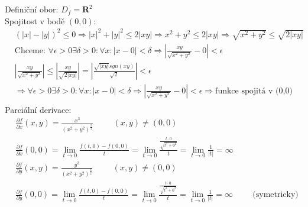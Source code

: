 \documentclass[a4paper]{article}
\begin{document}
\text{}\vspace{-0.1cm}
{\fontsize{12}{15}\selectfont \hspace{-0.5cm}}

\section{}
Definiční obor: $D_f = \mathbf{R}^2$ \\
Spojitost v bodě $(0,0)$:
\begin{align*}
	& (|x|-|y|)^2 \le 0 \Rightarrow |x|^2 + |y|^2 \le 2|xy| \Rightarrow x^2 + y^2 \le 2|xy| \Rightarrow \sqrt{x^2 + y^2} \le \sqrt{2|xy|} \\
	& \text{Chceme: } \forall \epsilon >0 \exists \delta >0: \forall x: |x-0| < \delta \Rightarrow |\frac{xy}{\sqrt{x^2 +y^2}}-0| < \epsilon \\
	& |\frac{xy}{\sqrt{x^2 +y^2}}| \le |\frac{xy}{\sqrt{2|xy|}}| = |\frac{\sqrt{|xy|} sgn(xy)}{\sqrt{2}}| < \epsilon \\
	& \Rightarrow \forall \epsilon >0 \exists \delta >0: \forall x: |x-0| < \delta \Rightarrow |\frac{xy}{\sqrt{x^2 +y^2}}-0| < \epsilon \Rightarrow \text{funkce spojitá v (0,0)} \\
\end{align*}
Parciální derivace:
\begin{align*}
	& \frac{\partial f}{\partial x} (x,y) = \frac{x^3}{(x^2 + y^2)^{\frac{3}{2}}} \hspace{1cm} (x,y) \ne (0,0) \\
	& \frac{\partial f}{\partial x} (0,0) = \lim_{t \to 0} \frac{f(t,0) - f(0,0)}{t} = \lim_{t \to 0} \frac{\frac{t\cdot 0}{\sqrt{t^2+0^2}}}{t} = \lim_{t \to 0} \frac{1}{|t|} = \infty \\
	& \frac{\partial f}{\partial y} (x,y) = \frac{y^3}{(x^2 + y^2)^{\frac{3}{2}}} \hspace{1cm} (x,y) \ne (0,0) \\
	& \frac{\partial f}{\partial y} (0,0) = \lim_{t \to 0} \frac{f(t,0) - f(0,0)}{t} = \lim_{t \to 0} \frac{\frac{t\cdot 0}{\sqrt{t^2+0^2}}}{t} = \lim_{t \to 0} \frac{1}{|t|} = \infty \hspace{1cm} \text{(symetricky)} \\
\end{align*}
\end{document}
